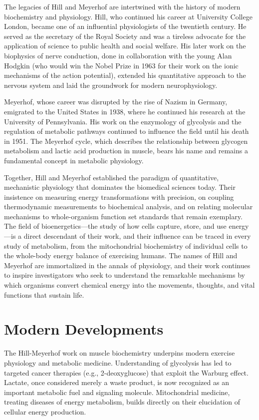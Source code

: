 The legacies of Hill and Meyerhof are intertwined with the history of modern biochemistry and physiology. Hill, who continued his career at University College London, became one of an influential physiologists of the twentieth century. He served as the secretary of the Royal Society and was a tireless advocate for the application of science to public health and social welfare. His later work on the biophysics of nerve conduction, done in collaboration with the young Alan Hodgkin (who would win the Nobel Prize in 1963 for their work on the ionic mechanisms of the action potential), extended his quantitative approach to the nervous system and laid the groundwork for modern neurophysiology.

Meyerhof, whose career was disrupted by the rise of Nazism in Germany, emigrated to the United States in 1938, where he continued his research at the University of Pennsylvania. His work on the enzymology of glycolysis and the regulation of metabolic pathways continued to influence the field until his death in 1951. The Meyerhof cycle, which describes the relationship between glycogen metabolism and lactic acid production in muscle, bears his name and remains a fundamental concept in metabolic physiology.

Together, Hill and Meyerhof established the paradigm of quantitative, mechanistic physiology that dominates the biomedical sciences today. Their insistence on measuring energy transformations with precision, on coupling thermodynamic measurements to biochemical analysis, and on relating molecular mechanisms to whole-organism function set standards that remain exemplary. The field of bioenergetics---the study of how cells capture, store, and use energy---is a direct descendant of their work, and their influence can be traced in every study of metabolism, from the mitochondrial biochemistry of individual cells to the whole-body energy balance of exercising humans. The names of Hill and Meyerhof are immortalized in the annals of physiology, and their work continues to inspire investigators who seek to understand the remarkable mechanisms by which organisms convert chemical energy into the movements, thoughts, and vital functions that sustain life.


\section{Modern Developments}

The Hill-Meyerhof work on muscle biochemistry underpins modern exercise physiology and metabolic medicine. Understanding of glycolysis has led to targeted cancer therapies (e.g., 2-deoxyglucose) that exploit the Warburg effect. Lactate, once considered merely a waste product, is now recognized as an important metabolic fuel and signaling molecule. Mitochondrial medicine, treating diseases of energy metabolism, builds directly on their elucidation of cellular energy production.
